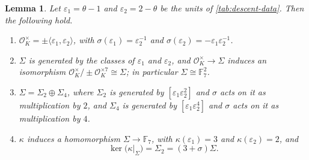 \documentclass[12pt]{amsart}
\newcommand{\F}{{\mathbb F}}
\newcommand{\OO}{{\mathcal O}}
\numberwithin{equation}{section}
\newtheorem{lemma}[theorem]{Lemma}
\theoremstyle{definition}
\begin{document}
\begin{lemma}
  \label{lem:V}
  Let $\varepsilon_1 = \theta - 1$ and $\varepsilon_2 = 2 - \theta$ be the units of
  \cref{tab:descent-data}. Then the following hold.
  \begin{enumerate}
  \item \label{item:units} $\OO_K^{\times} = \pm\langle \varepsilon_1,\varepsilon_2\rangle$,
    with $\sigma(\varepsilon_1) = \varepsilon_2^{-1}$ and
    $\sigma(\varepsilon_2) = -\varepsilon_1\varepsilon_2^{-1}$.
  \item \label{item:F72} $\Sigma$ is generated by the classes of $\varepsilon_1$
    and $\varepsilon_2$, and $\OO_K^{\times} \to \Sigma$ induces an isomorphism
    $\OO_K^{\times}/\pm\OO_K^{\times 7} \cong \Sigma$; in particular
    $\Sigma \cong \F_7^{2}$.
  \item \label{item:V-structure} $\Sigma = \Sigma_2 \oplus \Sigma_4$, where
    $\Sigma_2$ is generated by $[\varepsilon_1\varepsilon_2^{2}]$ and $\sigma$
    acts on it as multiplication by $2$, and $\Sigma_4$ is generated by
    $[\varepsilon_1\varepsilon_2^{4}]$ and $\sigma$ acts on it as multiplication
    by $4$.
  \item \label{item:kernel} $\kappa$ induces a homomorphism $\Sigma \to \F_7$,
    with $\kappa(\varepsilon_1) = 3$ and $\kappa(\varepsilon_2) = 2$, and
    \[
      \ker\bigl(\kappa|_{\Sigma}\bigr) = \Sigma_2 = (3+\sigma)\Sigma .
    \]
  \end{enumerate}
\end{lemma}
\end{document}
